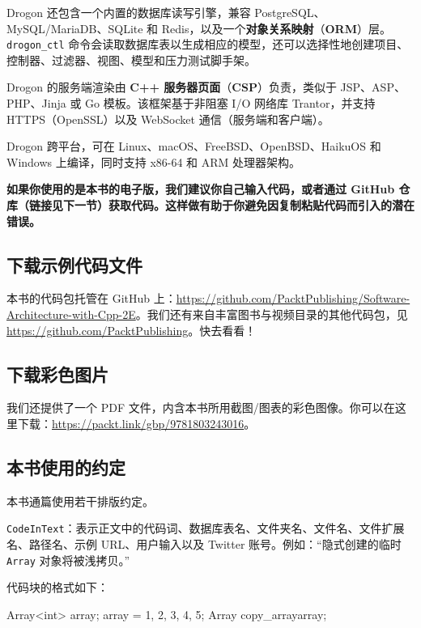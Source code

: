 Drogon 还包含一个内置的数据库读写引擎，兼容 PostgreSQL、MySQL/MariaDB、SQLite 和 Redis，以及一个\textbf{对象关系映射}（\textbf{ORM}）层。\texttt{drogon\_\allowbreak{}ctl} 命令会读取数据库表以生成相应的模型，还可以选择性地创建项目、控制器、过滤器、视图、模型和压力测试脚手架。

Drogon 的服务端渲染由 \textbf{C++ 服务器页面}（\textbf{CSP}）负责，类似于 JSP、ASP、PHP、Jinja 或 Go 模板。该框架基于非阻塞 I/O 网络库 Trantor，并支持 HTTPS（OpenSSL）以及 WebSocket 通信（服务端和客户端）。

Drogon 跨平台，可在 Linux、macOS、FreeBSD、OpenBSD、HaikuOS 和 Windows 上编译，同时支持 x86-64 和 ARM 处理器架构。

\textbf{如果你使用的是本书的电子版，我们建议你自己输入代码，或者通过 GitHub 仓库（链接见下一节）获取代码。这样做有助于你避免因复制粘贴代码而引入的潜在错误。}

\subsection*{下载示例代码文件}

本书的代码包托管在 GitHub 上：\href{https://github.com/PacktPublishing/Software-Architecture-with-Cpp-2E}{https://github.com/PacktPublishing/Software-Architecture-with-Cpp-2E}。我们还有来自丰富图书与视频目录的其他代码包，见 \href{https://github.com/PacktPublishing}{https://github.com/PacktPublishing}。快去看看！

\subsection*{下载彩色图片}

我们还提供了一个 PDF 文件，内含本书所用截图/图表的彩色图像。你可以在这里下载：\href{https://packt.link/gbp/9781803243016}{https://packt.link/gbp/9781803243016}。

\subsection*{本书使用的约定}

本书通篇使用若干排版约定。

\texttt{Code\allowbreak{}In\allowbreak{}Text}：表示正文中的代码词、数据库表名、文件夹名、文件名、文件扩展名、路径名、示例 URL、用户输入以及 Twitter 账号。例如：“隐式创建的临时 \texttt{Array} 对象将被浅拷贝。”

代码块的格式如下：

\begin{codebox}[text]
Array<int> array{};
array = {1, 2, 3, 4, 5};
Array copy_array{array};
\end{codebox}

